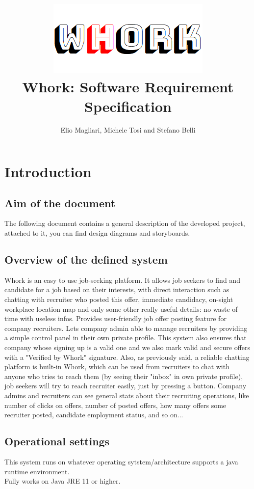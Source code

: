 \documentclass[12pt, a4paper]{article}
\title{\includegraphics{logo.png}\\Whork: Software Requirement Specification}
\author{Elio Magliari, Michele Tosi and Stefano Belli}
\date{}
\begin{document}
\maketitle
\section{Introduction}
\subsection{Aim of the document}
The following document contains a general description of the developed project, attached to it, you can find
design diagrams and storyboards.
\subsection{Overview of the defined system}
Whork is an easy to use job-seeking platform. It allows job seekers to find and candidate for a job based on their interests, with direct interaction such as
chatting with recruiter who posted this offer, immediate candidacy, on-sight workplace location map and only some other really useful details: no waste of time with useless infos.
Provides user-friendly job offer posting feature for company recruiters. Lets company admin able to manage recruiters by providing
a simple control panel in their own private profile. This system also ensures that company whose signing up is a valid one and we also mark
valid and secure offers with a "Verified by Whork" signature. Also, as previously said, a reliable chatting platform is built-in Whork, which can be used from recruiters to chat with
anyone who tries to reach them (by seeing their "inbox" in own private profile), job seekers will try to reach recruiter easily, just by pressing a button. Company admins and recruiters
can see general stats about their recruiting operations, like number of clicks on offers, number of posted offers, how many offers some recruiter posted, candidate employment status, and so on...
\subsection{Operational settings}
This system runs on whatever operating sytstem/architecture supports a java runtime environment.\\
 Fully works on Java JRE 11 or higher.
\end{document}
